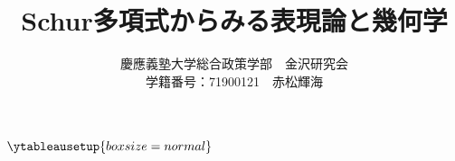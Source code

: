 \documentclass{ltjsreport}
\title{Schur多項式からみる表現論と幾何学}
\author{慶應義塾大学総合政策学部　金沢研究会\\学籍番号：71900121　赤松輝海}
\date{}
\begin{document}
\maketitle

\newpage


\tableofcontents
\newpage


\newpage


\newpage


\newpage


\appendix
$\ytableausetup{boxsize=normal}$



\newpage

\end{document}
